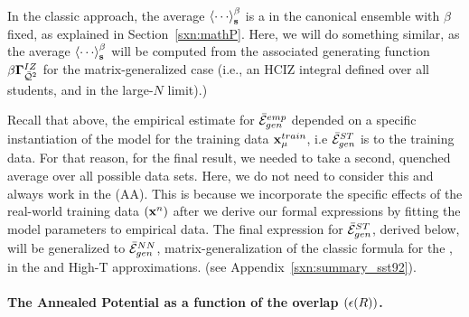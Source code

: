 In the classic \STATMECH approach, the average $\THRMAVG{\cdots}$ is
a \ThermalAverage in the canonical ensemble with $\beta$ fixed,
as explained in Section~\ref{sxn:mathP}.  Here, we will do something similar, as the \Student
average $\THRMAVG{\cdots}$ will be computed from the associated
generating function $\beta\mathbf{\Gamma}^{IZ}_{\bar{\mathcal{Q}}^{2}}$ for the matrix-generalized case  (i.e., an HCIZ integral defined over all students,
and in the large-$N$ limit).)

Recall that above, the empirical estimate for $\bar{\mathcal{E}}^{emp}_{gen}$ depended on a
specific instantiation of the model for the training data $\mathbf{x}_{\mu}^{train}$,
i.e  $\bar{\mathcal{E}}^{ST}_{gen}$ is \Quenched to the training data.
For that reason, for the final result, we needed to take a second,
quenched average over all possible data sets.
Here, we do not need to consider this and always work in the \AnnealedApproximation(AA).
This is because we incorporate
the specific effects of the real-world training data $(\mathbf{x}^{n})$ after we derive our formal expressions
by fitting the model parameters to empirical data.
The final expression for $\bar{\mathcal{E}}^{ST}_{gen}$, derived below,
will be generalized to $\bar{\mathcal{E}}^{NN}_{gen}$, matrix-generalization of  the classic \STATMECH formula
for the \LinearPerceptron, in the \Annealed and High-T approximations.
(see Appendix~\ref{sxn:summary_sst92}). 


\paragraph{The Annealed Potential as a function of the overlap $(\epsilon(R))$.}

